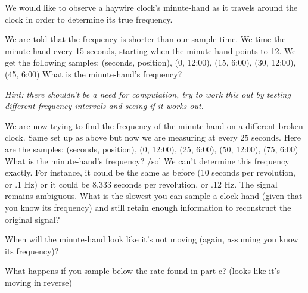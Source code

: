 


We would like to observe a haywire clock’s minute-hand as it travels around the clock in order to determine its true frequency.


\begin{enumerate}
\qitem We are told that the frequency is shorter than our sample time. We time the minute hand every 15 seconds, starting when the minute hand points to 12. We get the following samples:
(seconds, position), (0, 12:00), (15, 6:00), (30, 12:00), (45, 6:00) 
What is the minute-hand’s frequency?

\textit{Hint: there shouldn’t be a need for computation, try to work this out by testing different frequency intervals and seeing if it works out.}


\qitem We are now trying to find the frequency of the minute-hand on a different broken clock. Same set up as above but now we are measuring at every 25 seconds. Here are the samples:
(seconds, position), (0, 12:00), (25, 6:00), (50, 12:00), (75, 6:00)
What is the minute-hand’s frequency?
/sol{
We can’t determine this frequency exactly. For instance, it could be the same as before (10 seconds per revolution, or .1 Hz) or it could be 8.333 seconds per revolution, or .12 Hz. The signal remains ambiguous.
}
\qitem What is the slowest you can sample a clock hand (given that you know its frequency) and still retain enough information to reconstruct the original signal?


\qitem When will the minute-hand look like it’s not moving (again, assuming you know its frequency)?


\qitem What happens if you sample below the rate found in part c? (looks like it’s moving in reverse)


\end{enumerate}
